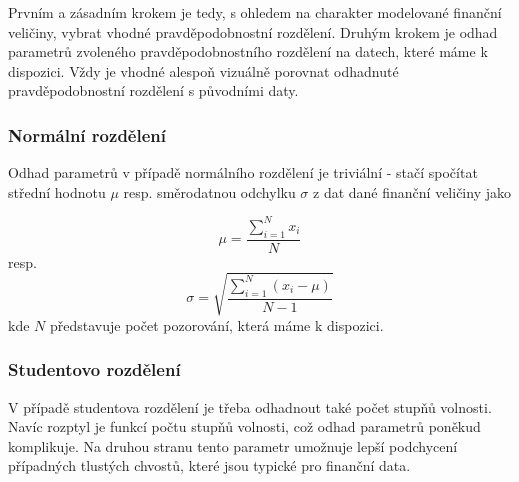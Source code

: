 Prvním a zásadním krokem je tedy, s ohledem na charakter modelované finanční veličiny, vybrat vhodné pravděpodobnostní rozdělení. Druhým krokem je odhad parametrů zvoleného pravděpodobnostního rozdělení na datech, které máme k dispozici. Vždy je vhodné alespoň vizuálně porovnat odhadnuté pravděpodobnostní rozdělení s původními daty.

\subsubsection{Normální rozdělení}

Odhad parametrů v případě normálního rozdělení je triviální - stačí spočítat střední hodnotu $\mu$ resp. směrodatnou odchylku $\sigma$ z dat dané finanční veličiny jako

\begin{equation*}
\mu = \frac{\sum_{i = 1}^N x_i}{N}
\end{equation*}
resp.
\begin{equation*}
\sigma = \sqrt{\frac{\sum_{i = 1}^N(x_i - \mu)}{N - 1}}
\end{equation*}
kde $N$ představuje počet pozorování, která máme k dispozici.

\subsubsection{Studentovo rozdělení}

V případě studentova rozdělení je třeba odhadnout také počet stupňů volnosti. Navíc rozptyl je funkcí počtu stupňů volnosti, což odhad parametrů poněkud komplikuje. Na druhou stranu tento parametr umožnuje lepší podchycení případných tlustých chvostů, které jsou typické pro finanční data.

